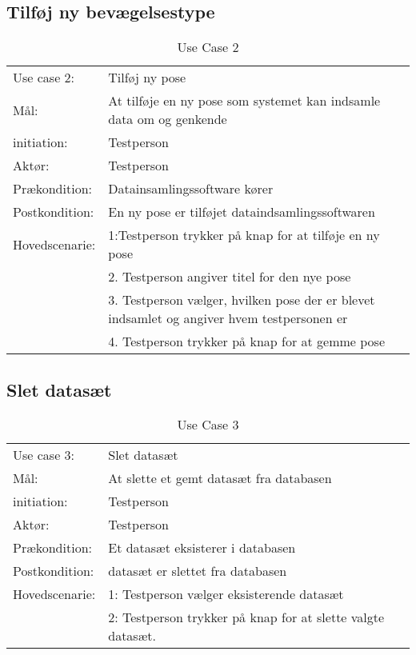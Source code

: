 \subsection{Tilføj ny bevægelsestype}
\begin{center}
	\begin{table}[htbp]
		\begin{tabular}{lp{10cm}}
			\rowcolor{grey} Use case 2:		& Tilføj ny pose\\
			Mål: 	& At tilføje en ny pose som systemet kan indsamle data om og genkende \\
			initiation:	& Testperson\\
			Aktør: & Testperson\\
			Prækondition: & Datainsamlingssoftware kører \\
			Postkondition: & En ny pose er tilføjet dataindsamlingssoftwaren\\
			Hovedscenarie: & 1:Testperson trykker på knap for at tilføje en ny pose\\
			& 2. Testperson angiver titel for den nye pose\\
			& 3. Testperson vælger, hvilken pose der er blevet indsamlet og angiver hvem testpersonen er\\
			& 4. Testperson trykker på knap for at gemme pose\\
		\end{tabular}
		\caption{Use Case 2}
	\end{table}
\end{center}

\subsection{Slet datasæt}
\begin{center}
	\begin{table}[htbp]
		\begin{tabular}{lp{10cm}}
			\rowcolor{grey} Use case 3:	& Slet datasæt \\
			Mål:	& At slette et gemt datasæt fra databasen \\
			initiation:	& Testperson\\
			Aktør: & Testperson\\
			Prækondition: & Et datasæt eksisterer i databasen\\
			Postkondition: & datasæt er slettet fra databasen\\
			Hovedscenarie: & 1: Testperson vælger eksisterende datasæt\\
			& 2: Testperson trykker på knap for at slette valgte datasæt.
		\end{tabular}
		\caption{Use Case 3}
	\end{table}
\end{center}

